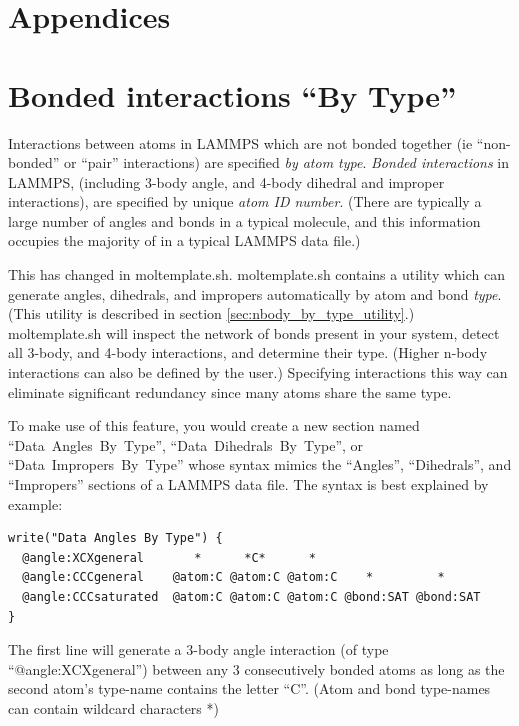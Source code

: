 \documentclass[11pt]{article}
\begin{document}
\pagebreak



\appendix
\section*{Appendices}

\section{Bonded interactions ``By Type''}
\label{sec:nbody_by_type}

Interactions between atoms in LAMMPS which are not bonded together
(ie ``non-bonded'' or ``pair'' interactions) 
are specified \textit{by atom type}.
\textit{Bonded interactions} in LAMMPS, 
(including 3-body angle, and 4-body dihedral and improper interactions),
are specified by unique \textit{atom ID number}.
(There are typically a large number of angles and bonds in 
a typical molecule, and this information occupies the 
majority of in a typical LAMMPS data file.)

This has changed in moltemplate.sh.  moltemplate.sh contains a 
utility which can generate angles, dihedrals, and impropers
automatically by atom and bond \textit{type}.
(This utility is described in section \ref{sec:nbody_by_type_utility}.)
moltemplate.sh will inspect the network of bonds present in your system, 
detect all 3-body, and 4-body interactions, and determine their type.
(Higher n-body interactions can also be defined by the user.)
Specifying interactions this way can eliminate significant redundancy 
since many atoms share the same type. 

To make use of this feature, you would create a new section named
\mbox{``Data Angles By Type''}, \mbox{``Data Dihedrals By Type''}, 
or \mbox{``Data Impropers By Type''} 
whose syntax mimics the 
\mbox{``Angles''}, \mbox{``Dihedrals''}, and \mbox{``Impropers''} 
sections of a LAMMPS data file.
The syntax is best explained by example:

\begin{verbatim}
write("Data Angles By Type") {
  @angle:XCXgeneral       *      *C*      *
  @angle:CCCgeneral    @atom:C @atom:C @atom:C    *         *
  @angle:CCCsaturated  @atom:C @atom:C @atom:C @bond:SAT @bond:SAT
}
\end{verbatim}

The first line will generate a 3-body angle interaction 
(of type \mbox{``@angle:XCXgeneral''})
between any 3 consecutively bonded atoms 
as long as the second atom's type-name contains the letter ``C''.
(Atom and bond type-names can contain wildcard characters *)
\end{document}
